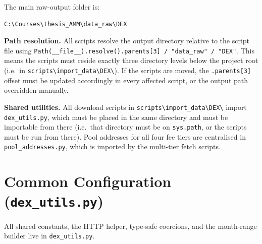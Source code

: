 \documentclass[11pt,a4paper]{article}
\begin{document}
The main raw-output folder is:
\begin{lstlisting}
C:\Courses\thesis_AMM\data_raw\DEX
\end{lstlisting}

\noindent\textbf{Path resolution.} All scripts resolve the output directory
relative to the script file using
\texttt{Path(\_\_file\_\_).resolve().parents[3] / "data\_raw" / "DEX"}.
This means the scripts must reside exactly three directory levels below the
project root (i.e.\ in
\texttt{scripts\textbackslash import\_data\textbackslash DEX\textbackslash}).
If the scripts are moved, the \texttt{.parents[3]} offset must be updated
accordingly in every affected script, or the output path overridden manually.

\noindent\textbf{Shared utilities.} All download scripts in
\texttt{scripts\textbackslash import\_data\textbackslash DEX\textbackslash}
import \texttt{dex\_utils.py}, which must be placed in the same directory
and must be importable from there (i.e.\ that directory must be on
\texttt{sys.path}, or the scripts must be run from there).
Pool addresses for all four fee tiers are centralised in
\texttt{pool\_addresses.py}, which is imported by the multi-tier fetch
scripts.

\section{Common Configuration (\texttt{dex\_utils.py})}
\label{sec:config}

All shared constants, the HTTP helper, type-safe coercions, and the
month-range builder live in \texttt{dex\_utils.py}.
\end{document}
